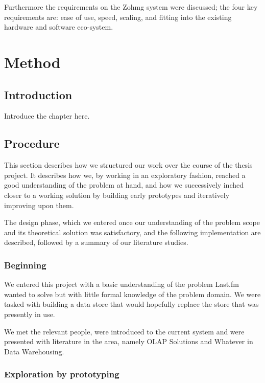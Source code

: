 Furthermore the requirements on the Zohmg system were discussed; the four key
requirements are: ease of use, speed, scaling, and fitting into the existing
hardware and software eco-system.



\chapter{Method}



\section*{Introduction}

Introduce the chapter here.


\section{Procedure}

This section describes how we structured our work over the course of the thesis
project. It describes how we, by working in an exploratory fashion, reached a
good understanding of the problem at hand, and how we successively inched closer
to a working solution by building early prototypes and iteratively improving
upon them.

The design phase, which we entered once our understanding of the problem scope
and its theoretical solution was satisfactory, and the following implementation
are described, followed by a summary of our literature studies.

\subsection*{Beginning}


We entered this project with a basic understanding of the problem Last.fm wanted
to solve but with little formal knowledge of the problem domain. We were tasked
with building a data store that would hopefully replace the store that was
presently in use.

We met the relevant people, were introduced to the current system and were
presented with literature in the area, namely OLAP Solutions and Whatever in
Data Warehousing.

\subsection*{Exploration by prototyping}

